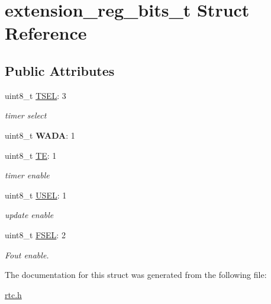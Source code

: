 \hypertarget{structextension__reg__bits__t}{}\section{extension\+\_\+reg\+\_\+bits\+\_\+t Struct Reference}
\label{structextension__reg__bits__t}
\subsection*{Public Attributes}
\begin{DoxyCompactItemize}
\item 
\mbox{\label{structextension__reg__bits__t_aeb0b4ad7c8aad52031feab145108e0a1}} 
uint8\+\_\+t \hyperlink{structextension__reg__bits__t_aeb0b4ad7c8aad52031feab145108e0a1}{T\+S\+EL}\+: 3
\begin{DoxyCompactList}\small\item\em timer select \end{DoxyCompactList}\item 
\mbox{\label{structextension__reg__bits__t_a114ecadf84a381a514c8c30986ec6fc5}} 
uint8\+\_\+t {\bfseries W\+A\+DA}\+: 1
\item 
\mbox{\label{structextension__reg__bits__t_a0d7b9a9404cd5758bf6b2d32ecf3e655}} 
uint8\+\_\+t \hyperlink{structextension__reg__bits__t_a0d7b9a9404cd5758bf6b2d32ecf3e655}{TE}\+: 1
\begin{DoxyCompactList}\small\item\em timer enable \end{DoxyCompactList}\item 
\mbox{\label{structextension__reg__bits__t_afb5b997301ff353277f82bf006d8fcc9}} 
uint8\+\_\+t \hyperlink{structextension__reg__bits__t_afb5b997301ff353277f82bf006d8fcc9}{U\+S\+EL}\+: 1
\begin{DoxyCompactList}\small\item\em update enable \end{DoxyCompactList}\item 
\mbox{\label{structextension__reg__bits__t_ae3ad79c6e390c5d253aa17f85898c030}} 
uint8\+\_\+t \hyperlink{structextension__reg__bits__t_ae3ad79c6e390c5d253aa17f85898c030}{F\+S\+EL}\+: 2
\begin{DoxyCompactList}\small\item\em Fout enable. \end{DoxyCompactList}\end{DoxyCompactItemize}


The documentation for this struct was generated from the following file\+:\begin{DoxyCompactItemize}
\item 
\hyperlink{rtc_8h}{rtc.\+h}\end{DoxyCompactItemize}
